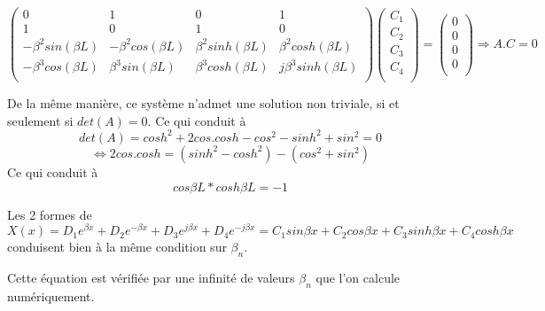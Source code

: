 \documentclass[a4paper,10pt]{article}
\begin{document}
\begin{equation} 
	\begin{pmatrix}
   	0 	& 1	& 0 	& 1	\\
   	 1 & 0	& 1	& 0	\\
  	 -\beta^2sin(\beta L)	&-\beta^2cos(\beta L)		&\beta^2 sinh(\beta L)		&\beta^2cosh(\beta L)		\\
	-\beta^3cos(\beta L)	&\beta^3sin(\beta L)		&\beta^3 cosh(\beta L)		&j\beta^3 sinh(\beta L)		\\
	\end{pmatrix} 
	\begin{pmatrix}
   	C_1 	\\
   	C_2	\\
  	C_3	\\
	C_4	\\
	\end{pmatrix} 
= 
	\begin{pmatrix}
   	0 	\\
   	0	\\
  	0	\\
	0	\\
	\end{pmatrix} 
	\Rightarrow
	A.C=0
\end{equation}

De la même manière, ce système n'admet une solution non triviale, si et seulement si \begin{math} det(A)=0 \end{math}. Ce qui conduit à 
\begin{equation} det(A) =cosh^2 + 2cos.cosh - cos^2 - sin  h^2 + sin^2 = 0   \end{equation}
\begin{equation}\iff 2cos.cosh = (sinh^2 - cosh^2) - (cos^2 + sin^2)   \end{equation}
Ce qui conduit à 
\begin{equation} cos\beta L * cosh \beta L = -1  \end{equation}

Les 2 formes de \begin{math} X(x) = D_1 e^{\beta x} +  D_2 e^{-\beta x} +  D_3 e^{j\beta x} +  D_4 e^{-j\beta x} =  C_1 sin{\beta x} +  C_2 cos{\beta x} +  C_3 sinh{\beta x} +  C_4 cosh{\beta x} \end{math} conduisent bien à la même condition sur \begin{math} \beta_n \end{math}.




Cette équation est vérifiée par une infinité de valeurs \begin{math} \beta_n \end{math} que l'on calcule numériquement. 
\end{document}
